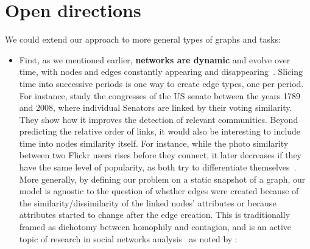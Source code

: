 \section{Open directions}
\label{sec:edge_conc}

We could extend our approach to more general types of graphs and tasks:

\begin{itemize}[leftmargin=*]

  \item First, as we mentioned earlier, \textbf{networks are dynamic} and evolve over time, with
    nodes and edges constantly appearing and disappearing~\autocite{networkEvolution14}. Slicing
    time into successive periods is one way to create edge types, one per period. For instance,
    \textcite{TimedUSSenate10} study the  congresses of the US senate between the years 1789
    and 2008, where  individual Senators are linked by their voting similarity. They show
    how it improves the detection of relevant communities. Beyond predicting the relative order of
    links, it would also be interesting to include time into nodes similarity itself.
    For instance, while the photo similarity between two Flickr users rises before they connect, it
    later decreases if they have the same level of popularity, as both try to differentiate
    themselves~\autocite{dynamicFlickr13}.
    More generally, by defining our problem on a static snapshot of a graph, our model is agnostic
    to the question of whether edges were created because of the similarity/dissimilarity of
    the linked nodes' attributes or because attributes started to change after the edge creation.
    This is traditionally framed as dichotomy between homophily and contagion, and is an active topic
    of research in social networks analysis~\autocites{InfluenceVsHomo08}{ConfoundedHomophily11} as
    noted by \textcite{OSNreview14}: 


\end{itemize}
